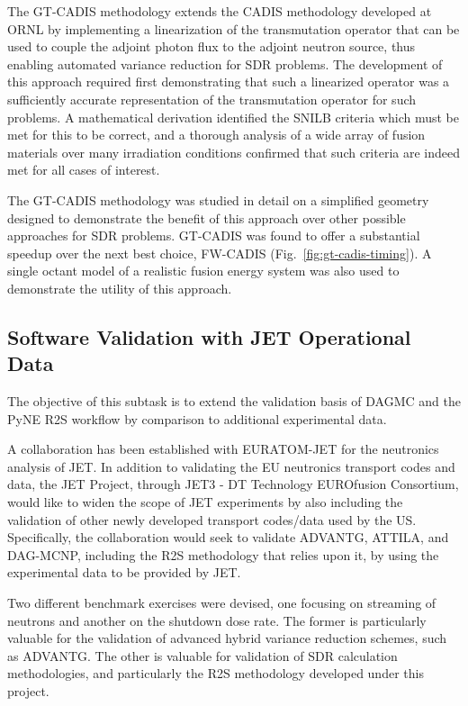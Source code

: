 The \gls{GT-CADIS} methodology extends the \gls{CADIS} methodology developed
at \gls{ORNL} by implementing a linearization of the transmutation operator
that can be used to couple the adjoint photon flux to the adjoint neutron
source, thus enabling automated variance reduction for \gls{SDR} problems.
The development of this approach required first demonstrating that such a
linearized operator was a sufficiently accurate representation of the
transmutation operator for such problems.  A mathematical derivation
identified the \gls{SNILB} criteria which must be met for this to be correct,
and a thorough analysis of a wide array of fusion materials over many
irradiation conditions confirmed that such criteria are indeed met for all
cases of interest.

The \gls{GT-CADIS} methodology was studied in detail on a simplified geometry
designed to demonstrate the benefit of this approach over other possible
approaches for \gls{SDR} problems.  \gls{GT-CADIS} was found to offer a
substantial speedup over the next best choice, \gls{FW-CADIS}
(Fig.\ \ref{fig:gt-cadis-timing}). A single octant model
of a realistic fusion energy system was also used to demonstrate the utility
of this approach.

\subsection{Software Validation with JET Operational Data}

The objective of this subtask is to extend the validation basis of \gls{DAGMC}
and the PyNE \gls{R2S} workflow by comparison to additional experimental data.

A collaboration has been established with EURATOM-JET for the neutronics
analysis of JET.  In addition to validating the EU neutronics transport codes
and data, the JET Project, through JET3 - DT Technology EUROfusion Consortium,
would like to widen the scope of JET experiments by also including the
validation of other newly developed transport codes/data used by the US.
Specifically, the collaboration would seek to validate ADVANTG, ATTILA, and
DAG-MCNP, including the \gls{R2S} methodology that relies upon it, by using
the experimental data to be provided by JET.

Two different benchmark exercises were devised, one focusing on streaming of
neutrons and another on the shutdown dose rate.  The former is particularly
valuable for the validation of advanced hybrid variance reduction schemes,
such as ADVANTG.  The other is valuable for validation of \gls{SDR}
calculation methodologies, and particularly the \gls{R2S} methodology
developed under this project.

